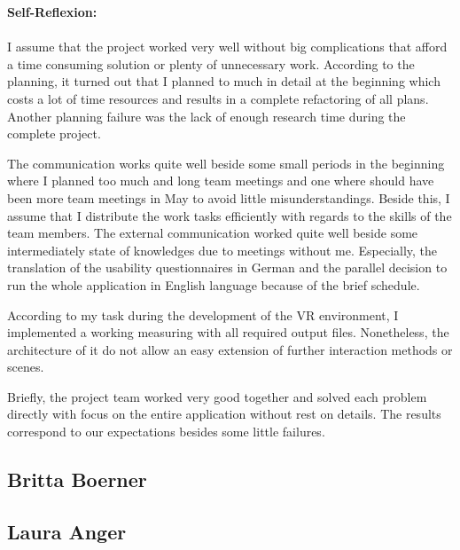 \textbf{Self-Reflexion:}\\ \\
I assume that the project worked very well without big complications that afford a time consuming solution or plenty of unnecessary work. According to the planning, it turned out that I planned to much in detail at the beginning which costs a lot of time resources and results in a complete refactoring of all plans. Another planning failure was the lack of enough research time during the complete project. 

The communication works quite well beside some small periods in the beginning where I planned too much and long team meetings and one where should have been more team meetings in May to avoid little misunderstandings. Beside this, I assume that I distribute the work tasks efficiently with regards to the skills of the team members. The external communication worked quite well beside some intermediately state of knowledges due to meetings without me. Especially, the translation of the usability questionnaires in German and the parallel decision to run the whole application in English language because of the brief schedule. 

According to my task during the development of the VR environment, I implemented a working measuring with all required output files. Nonetheless, the architecture of it do not allow an easy extension of further interaction methods or scenes. 

Briefly, the project team worked very good together and solved each problem directly with focus on the entire application without rest on details. The results correspond to our expectations besides some little failures.
\subsection{Britta Boerner} \label{sec:SABritta}

\newpage
\subsection{Laura Anger} \label{sec:SALaura}

